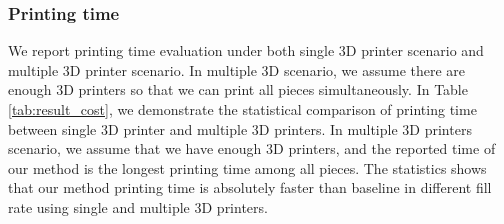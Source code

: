 \subsubsection{Printing time}
We report printing time evaluation under both single 3D printer scenario and multiple 3D printer scenario.
In multiple 3D scenario, we assume there are enough 3D printers so that we can print all pieces simultaneously.
In Table \ref{tab:result_cost}, we demonstrate the statistical comparison of printing time between single 3{D} printer and multiple 3{D} printers. 
In multiple 3{D} printers scenario, we assume that we have enough 3{D} printers, and the reported time of our method is the longest printing time among all pieces.
The statistics shows that our method printing time is absolutely faster than baseline in different fill rate using single and multiple 3{D} printers. 
